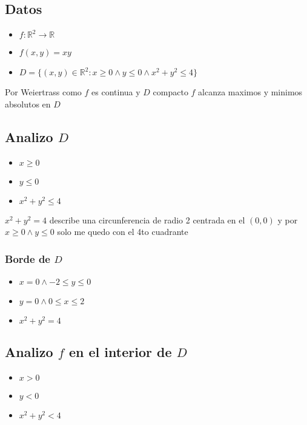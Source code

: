 \documentclass[../parcial.tex]{subfiles}
\begin{document}
    \subsection*{Datos}
        \begin{itemize}
            \item $f:\mathbb{R}^2 \to \mathbb{R}$
            \item $f(x,y) = xy$
            \item $D = \{ (x,y) \in \mathbb{R}^2: x \geq 0 \wedge y \leq 0 \wedge x^2+y^2 \leq 4\}$
        \end{itemize}

        Por Weiertrass como $f$ es continua y $D$ compacto $f$ alcanza maximos y minimos absolutos en $D$

    \subsection*{Analizo $D$}

        \begin{itemize}
            \item $x \geq 0 $
            \item $y \leq 0 $
            \item $x^2+y^2 \leq 4 $
        \end{itemize}

        $ x^2 + y^2 = 4 $ describe una circunferencia de radio 2 centrada en el $(0,0)$ y por $x \geq 0 \wedge y \leq 0$ solo me quedo con el 4to cuadrante

        \subsubsection*{Borde de $D$}

        \begin{itemize}
            \item $x = 0 \wedge -2 \leq y \leq 0$
            \item $y = 0 \wedge 0 \leq x \leq 2$
            \item $x^2 + y^2 = 4$
        \end{itemize}

    \subsection*{Analizo $f$ en el interior de $D$}

        \begin{itemize}
            \item $x > 0 $
            \item $y < 0 $
            \item $x^2+y^2 < 4 $
        \end{itemize}
\end{document}
